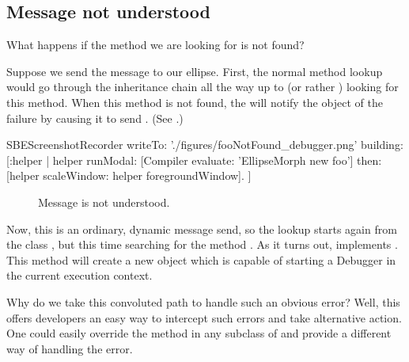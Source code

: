 \documentclass[a4paper,10pt,twoside]{book}
\begin{document}
\subsection{Message not understood}

What happens if the method we are looking for is not found?

Suppose we send the message  to our ellipse.
First, the normal method lookup would go through the inheritance chain all the way up to  (or rather ) looking for this method.
When this method is not found, the  will notify the object of the failure by causing it to send .
(See .)

\begin{ExecuteSmalltalkScript}
SBEScreenshotRecorder writeTo: './figures/fooNotFound_debugger.png' building: [:helper |
	helper
		runModal: [Compiler evaluate: 'EllipseMorph new foo']
		then: [helper scaleWindow: helper foregroundWindow].
]
\end{ExecuteSmalltalkScript}
\begin{figure}[htb]
\begin{center}
\begin{scaletikzpicturetowidth}{\textwidth} %
\end{scaletikzpicturetowidth}
\caption{Message  is not understood\label{fig:fooNotFound}.}
\end{center}
\end{figure}

Now, this is an ordinary, dynamic message send, so the lookup starts again from the class , but this time searching for the method .
As it turns out,  implements .
This method will create a new  object which is capable of starting a Debugger in the current execution context.

Why do we take this convoluted path to handle such an obvious error?
Well, this offers developers an easy way to intercept such errors and take alternative action.
One could easily override the method  in any subclass of  and  provide a different way of handling the error.
\end{document}

